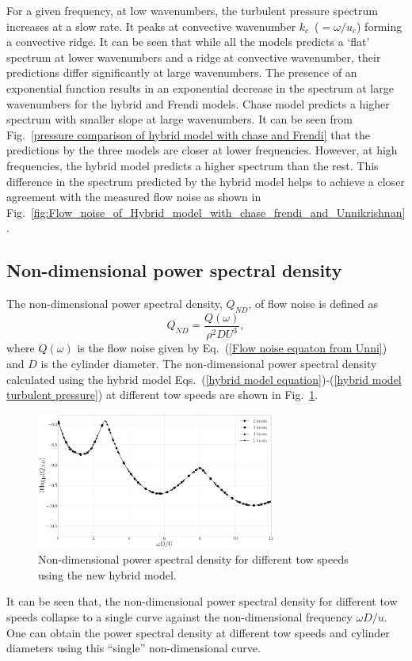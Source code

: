 \documentclass[twocolumn,10pt]{asme2ej}
\begin{document}
For a given frequency, at low wavenumbers, the turbulent pressure spectrum increases at a slow rate. It peaks at convective wavenumber $k_c$~($=\omega/u_c$) forming a convective ridge. It can be seen that while all the models predicts a `flat' spectrum at lower wavenumbers and a ridge at convective wavenumber, their predictions differ significantly at large wavenumbers. The presence of an exponential function results in an exponential decrease in the spectrum at large wavenumbers for the hybrid and Frendi models. Chase model predicts a higher spectrum with smaller slope at large wavenumbers. It can be seen from Fig.~\ref{pressure comparison of hybrid model with chase and Frendi} that the predictions by the three models are closer at lower frequencies. However, at high frequencies, the hybrid model predicts a higher spectrum than the rest. This difference in the spectrum predicted by the hybrid model helps to achieve a closer agreement with the measured flow noise as shown in Fig.~\ref{fig:Flow_noise_of_Hybrid_model_with_chase_frendi_and_Unnikrishnan}.

\subsection{Non-dimensional power spectral density}
The non-dimensional power spectral density, $Q_{ND}$, of flow noise is defined as
\begin{equation}
    Q_{ND} = \frac{Q(\omega)}{\rho^2 D U^3},
\end{equation}
where $Q(\omega)$ is the flow noise given by Eq.~(\ref{Flow noise equaton from Unni}) and $D$ is the cylinder diameter. The non-dimensional power spectral density calculated using the hybrid model Eqs.~(\ref{hybrid model equation})-(\ref{hybrid model turbulent pressure}) at different tow speeds are shown in Fig.~\ref{non dimensional plot of hybrid model}.
\begin{figure}[h]
    \centering
    \includegraphics[width=3.1in]{figure/Non dimensional plot of hybrid model.pdf}
    \caption{Non-dimensional power spectral density for different tow speeds using the new hybrid model.}
    \label{non dimensional plot of hybrid model}
\end{figure}
It can be seen that, the non-dimensional power spectral density for different tow speeds collapse to a single curve against the non-dimensional frequency $\omega D/u$. One can obtain the power spectral density at different tow speeds and cylinder diameters using this \enquote{single} non-dimensional curve.
\end{document}
